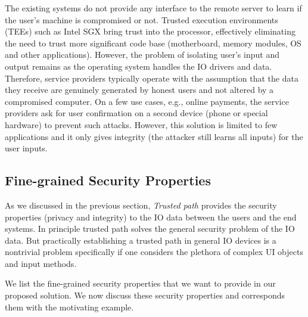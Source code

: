 The existing systems do not provide any interface to the remote server to learn if the user's machine is compromised or not. Trusted execution environments (TEEs) such as Intel SGX bring trust into the processor, effectively eliminating the need to trust more significant code base (motherboard, memory modules, OS and other applications). However, the problem of isolating user's input and output remains as the operating system handles the IO drivers and data. Therefore, service providers typically operate with the assumption that the data they receive are genuinely generated by honest users and not altered by a compromised computer. On a few use cases, e.g., online payments, the service providers ask for user confirmation on a second device (phone or special hardware) to prevent such attacks. However, this solution is limited to few applications and it only gives integrity (the attacker still learns all inputs) for the user inputs. 

\subsection{Fine-grained Security Properties}


As we discussed in the previous section, \emph{Trusted path} provides the security properties (privacy and integrity) to the IO data between the users and the end systems. In principle trusted path solves the general security problem of the IO data. But practically establishing a trusted path in general IO devices is a nontrivial problem specifically if one considers the plethora of complex UI objects and input methods.

We list the fine-grained security properties that we want to provide in our proposed solution. We now discuss these security properties and corresponds them with the motivating example.

